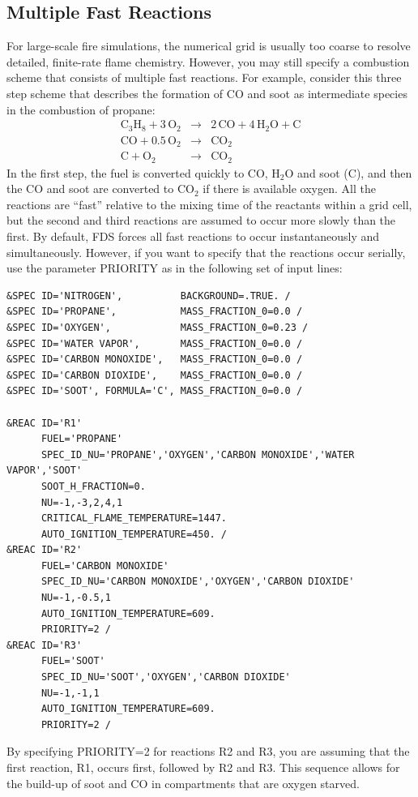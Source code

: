 \documentclass[11pt]{book}
\begin{document}
\subsection{Multiple Fast Reactions}
\label{info:priority}

For large-scale fire simulations, the numerical grid is usually too coarse to resolve detailed, finite-rate flame chemistry. However, you may still specify a combustion scheme that consists of multiple fast reactions. For example, consider this three step scheme that describes the formation of CO and soot as intermediate species in the combustion of propane:
\begin{eqnarray}
\label{eq:propane_3step}
\mathrm{C_3H_8} + \mathrm{3 \, O_2} &\longrightarrow& \mathrm{2 \, CO +  4 \, H_2O + C} \\
\mathrm{CO} + \mathrm{0.5 \, O_2} &\longrightarrow& \mathrm{CO_2} \\
\mathrm{C} + \mathrm{O_2} &\longrightarrow& \mathrm{CO_2}
\end{eqnarray}
In the first step, the fuel is converted quickly to CO, H$_2$O and soot (C), and then the CO and soot are converted to CO$_2$ if there is available oxygen. All the reactions are ``fast'' relative to the mixing time of the reactants within a grid cell, but the second and third reactions are assumed to occur more slowly than the first. By default, FDS forces all fast reactions to occur instantaneously and simultaneously. However, if you want to specify that the reactions occur serially, use the parameter {\ct PRIORITY} as in the following set of input lines:
\begin{lstlisting}
&SPEC ID='NITROGEN',          BACKGROUND=.TRUE. /
&SPEC ID='PROPANE',           MASS_FRACTION_0=0.0 /
&SPEC ID='OXYGEN',            MASS_FRACTION_0=0.23 /
&SPEC ID='WATER VAPOR',       MASS_FRACTION_0=0.0 /
&SPEC ID='CARBON MONOXIDE',   MASS_FRACTION_0=0.0 /
&SPEC ID='CARBON DIOXIDE',    MASS_FRACTION_0=0.0 /
&SPEC ID='SOOT', FORMULA='C', MASS_FRACTION_0=0.0 /

&REAC ID='R1'
      FUEL='PROPANE'
      SPEC_ID_NU='PROPANE','OXYGEN','CARBON MONOXIDE','WATER VAPOR','SOOT'
      SOOT_H_FRACTION=0.
      NU=-1,-3,2,4,1
      CRITICAL_FLAME_TEMPERATURE=1447.
      AUTO_IGNITION_TEMPERATURE=450. /
&REAC ID='R2'
      FUEL='CARBON MONOXIDE'
      SPEC_ID_NU='CARBON MONOXIDE','OXYGEN','CARBON DIOXIDE'
      NU=-1,-0.5,1
      AUTO_IGNITION_TEMPERATURE=609.
      PRIORITY=2 /
&REAC ID='R3'
      FUEL='SOOT'
      SPEC_ID_NU='SOOT','OXYGEN','CARBON DIOXIDE'
      NU=-1,-1,1
      AUTO_IGNITION_TEMPERATURE=609.
      PRIORITY=2 /
\end{lstlisting}
By specifying {\ct PRIORITY=2} for reactions {\ct R2} and {\ct R3}, you are assuming that the first reaction, {\ct R1}, occurs first, followed by {\ct R2} and {\ct R3}. This sequence allows for the build-up of soot and CO in compartments that are oxygen starved.
\end{document}
